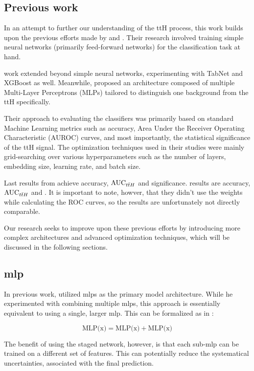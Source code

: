 \subsection{Previous work}

In an attempt to further our understanding of the ttH process, this work builds upon the previous efforts made by
\severin and \jan. Their research involved training simple neural networks
(primarily feed-forward networks) for the classification task at hand.

\jan work extended beyond simple neural networks, experimenting with TabNet and XGBoost as well. Meanwhile, \severin
proposed an architecture composed of multiple Multi-Layer Perceptrons (MLPs) tailored to distinguish one background from
the ttH specifically.

Their approach to evaluating the classifiers was primarily based on standard Machine Learning metrics such as accuracy,
Area Under the Receiver Operating Characteristic (AUROC) curves, and most importantly, the statistical significance of
the ttH signal. The optimization techniques used in their studies were mainly grid-searching over various
hyperparameters such as the number of layers, embedding size, learning rate, and batch size.

Last results from \severin achieve  accuracy,  $\text{AUC}_{t\bar{t}H}$ and 
significance. \jan results are  accuracy,  $\text{AUC}_{t\bar{t}H}$ and .
It is important to note, howver, that they didn't use the weights while calculating the ROC curves, so the results are
unfortunately not directly comparable.

Our research seeks to improve upon these previous efforts by introducing more complex architectures and advanced
optimization techniques, which will be discussed in the following sections.

\subsection[MLP]{\gls{mlp}}

In previous work, \severin utilized \glspl{mlp} as the primary model architecture.
While he experimented with combining multiple \glspl{mlp}, this approach is essentially equivalent to using a single,
larger \gls{mlp}. This can be formalized as in \cite{ft-transformer}:

$$
    \text{MLP(x)} = \text{MLP(x)} + \text{MLP(x)}
$$

The benefit of using the staged network, however, is that each sub-\gls{mlp} can be trained on a different set of
features. This can potentially reduce the systematical uncertainties, associated with the final prediction.